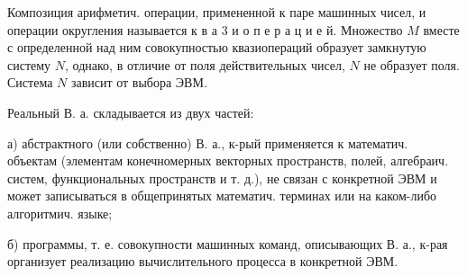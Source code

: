 \documentclass[10pt]{article}
\begin{document}
Композиция арифметич. операции, примененной к паре машинных чисел, и операции округления называется к в а 3 и о п е р а ц и е й. Множество $M$ вместе с определенной над ним совокупностью квазиопераций образует замкнутую систему $N$, однако, в отличие от поля действительных чисел, $N$ не образует поля. Система $N$ зависит от выбора ЭВМ.



Реальный В. а. складывается из двух частей:



а) абстрактного (или собственно) В. а., к-рый применяется к математич. объектам (элементам конечномерных векторных пространств, полей, алгебраич. систем, функциональных пространств и т. д.), не связан с конкретной ЭВМ и может записываться в общепринятых математич. терминах или на каком-либо алгоритмич. языке;



б) программы, т. е. совокупности машинных команд, описывающих В. а., к-рая организует реализацию вычислительного процесса в конкретной ЭВМ.
\end{document}
